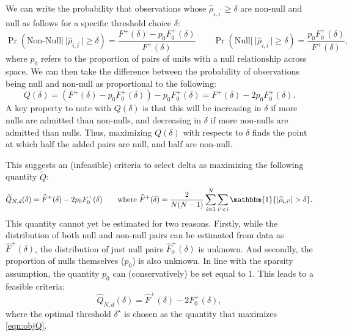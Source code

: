 \documentclass[varwidth,bib]{statapress}
\begin{document}
We can write the probability that observations whose $\widehat\rho_{i,i^\prime}\geq\delta$ are non-null and null as follows for a specific threshold choice $\delta$:
\begin{equation}
\Pr(\text{Non-Null}\big|\ \lvert\widehat\rho_{i,i^\prime}\rvert\geq\delta) = \frac{F^+(\delta)-p_0F_0^+(\delta)}{F^+(\delta)} \qquad \Pr(\text{Null}\big|\ \lvert\widehat\rho_{i,i^\prime}\rvert\geq\delta) = \frac{p_0F_0^+(\delta)}{F^+(\delta)},
\end{equation}
where $p_0$ refers to the proportion of pairs of units with a null relationship across space.  We can then take the difference between the probability of observations being null and non-null as proportional to the following:
\begin{equation}
Q(\delta)=(F^+(\delta)-p_0F_0^+(\delta))-p_0F_0^+(\delta) = F^+(\delta)-2p_0F_0^+(\delta).
\end{equation}
A key property to note with $Q(\delta)$ is that this will be increasing in $\delta$ if more nulls are admitted than non-nulls, and decreasing in $\delta$ if more non-nulls are admitted than nulls.  Thus, maximizing $Q(\delta)$ with respects to $\delta$ finds the point at which half the added pairs are null, and half are non-null.

This suggests an (infeasible) criteria to select delta as maximizing the following quantity $\widetilde{Q}$:
\begin{equation}
\widetilde{Q}_{N,d}(\delta)=\widehat{F}^+(\delta)-2p_0F_0^+(\delta) \qquad \text{where } \widehat{F}^+(\delta)=\frac{2}{N(N-1)}\sum_{i=1}^N\sum_{i^\prime<i}\mathbbm{1}\{\lvert\widehat\rho_{i,i^\prime}\rvert>\delta\}.
\end{equation}
This quantity cannot yet be estimated for two reasons.  Firstly,  while the distribution of both null and non-null pairs can be estimated from data as $\widehat{F}^+(\delta)$, the distribution of just null pairs $\widehat{F}_0^+(\delta)$ is unknown.  And secondly, the proportion of nulls themselves ($p_0$) is also unknown.  In line with the sparsity assumption, the quantity $p_0$ can (conservatively) be set equal to 1.  This leads to a feasible criteria: 
\begin{equation}
\label{eqn:objQ}
\widehat{Q}_{N,d}(\delta)=\widehat{F}^+(\delta)-2F_0^+(\delta),
\end{equation}
where the optimal threshold $\delta^\star$ is chosen as the quantity that maximizes \eqref{eqn:objQ}.
\end{document}

